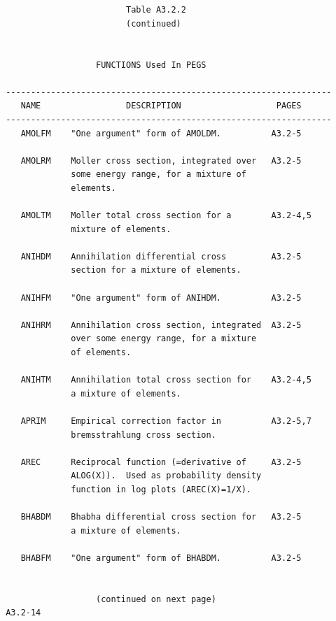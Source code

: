 \newpage {} \begin{verbatim}
 
 
                         Table A3.2.2
                         (continued)
 
 
                   FUNCTIONS Used In PEGS
 
 -----------------------------------------------------------------
    NAME                 DESCRIPTION                   PAGES
 -----------------------------------------------------------------
    AMOLFM    "One argument" form of AMOLDM.          A3.2-5
 
    AMOLRM    Moller cross section, integrated over   A3.2-5
              some energy range, for a mixture of
              elements.
 
    AMOLTM    Moller total cross section for a        A3.2-4,5
              mixture of elements.
 
    ANIHDM    Annihilation differential cross         A3.2-5
              section for a mixture of elements.
 
    ANIHFM    "One argument" form of ANIHDM.          A3.2-5
 
    ANIHRM    Annihilation cross section, integrated  A3.2-5
              over some energy range, for a mixture
              of elements.
 
    ANIHTM    Annihilation total cross section for    A3.2-4,5
              a mixture of elements.
 
    APRIM     Empirical correction factor in          A3.2-5,7
              bremsstrahlung cross section.
 
    AREC      Reciprocal function (=derivative of     A3.2-5
              ALOG(X)).  Used as probability density
              function in log plots (AREC(X)=1/X).
 
    BHABDM    Bhabha differential cross section for   A3.2-5
              a mixture of elements.
 
    BHABFM    "One argument" form of BHABDM.          A3.2-5
 
 
                   (continued on next page)
 A3.2-14 
\end{verbatim} 

